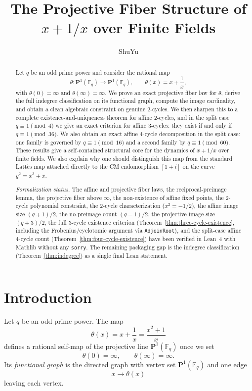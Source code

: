 \documentclass[11pt]{article}
\title{The Projective Fiber Structure of $x+1/x$ over Finite Fields}
\author{ShuYu}
\date{}
\newcommand{\F}{\mathbb{F}}
\newcommand{\Pone}{\mathbf{P}^1}
\begin{document}
\maketitle

\begin{abstract}
Let $q$ be an odd prime power and consider the rational map
\[
\theta:\Pone(\F_q)\to\Pone(\F_q),\qquad \theta(x)=x+\frac1x,
\]
with $\theta(0)=\infty$ and $\theta(\infty)=\infty$.
We prove an exact projective fiber law for $\theta$, derive the full indegree classification on its functional graph, compute the image cardinality, and obtain a clean algebraic constraint on genuine $2$-cycles.
We then sharpen this to a complete existence-and-uniqueness theorem for affine $2$-cycles, and in the split case $q\equiv 1\pmod4$ we give an exact criterion for affine $3$-cycles:
they exist if and only if $q\equiv 1\pmod{36}$.
We also obtain an exact affine $4$-cycle decomposition in the split case: one family is governed by $q\equiv 1\pmod{16}$ and a second family by $q\equiv 1\pmod{60}$.
These results give a self-contained structural core for the dynamics of $x+1/x$ over finite fields.
We also explain why one should distinguish this map from the standard Latt\`es map attached directly to the CM endomorphism $[1+i]$ on the curve $y^2=x^3+x$.

\medskip\noindent\textit{Formalization status.}
The affine and projective fiber laws, the reciprocal-preimage lemma, the projective fiber above $\infty$, the non-existence of affine fixed points, the $2$-cycle polynomial constraint, the $2$-cycle characterization ($x^2=-1/2$), the affine image size $(q+1)/2$, the no-preimage count $(q-1)/2$, the projective image size $(q+3)/2$, the full $3$-cycle existence criterion (Theorem~\ref{thm:three-cycle-existence}, including the Frobenius/cyclotomic argument via \texttt{AdjoinRoot}), and the split-case affine $4$-cycle count (Theorem~\ref{thm:four-cycle-existence}) have been verified in Lean~4 with Mathlib without any \texttt{sorry}.
The remaining packaging gap is the indegree classification (Theorem~\ref{thm:indegree}) as a single final Lean statement.
\end{abstract}

\section{Introduction}

Let $q$ be an odd prime power.
The map
\[
\theta(x)=x+\frac1x=\frac{x^2+1}{x}
\]
defines a rational self-map of the projective line $\Pone(\F_q)$ once we set
\[
\theta(0)=\infty,\qquad \theta(\infty)=\infty.
\]
Its \emph{functional graph} is the directed graph with vertex set $\Pone(\F_q)$ and one edge
\[
x\to\theta(x)
\]
leaving each vertex.
\end{document}

